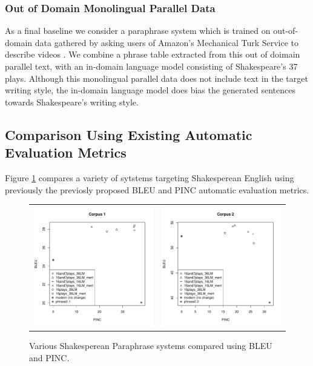 \documentclass[10pt,a5paper,twoside]{article}
\begin{document}
\subsubsection{Out of Domain Monolingual Parallel Data}
As a final baseline we consider a paraphrase system which is trained on out-of-domain data gathered by asking users of Amazon's Mechanical Turk Service 
\cite{Snow08} to describe videos \cite{chen11}.  We combine a phrase table extracted from this out of doimain parallel text, with an in-domain
language model consisting of Shakespeare's 37 plays.  Although this monolingual parallel data does not include text in the target writing style,
the in-domain language model does bias the generated sentences towards Shakespeare's writing style.

\subsection{Comparison Using Existing Automatic Evaluation Metrics}
Figure \ref{bleupinc} compares a variety of sytstems targeting Shakesperean English using previously the previosly proposed BLEU \cite{Papineni02} and PINC \cite{chen11} automatic evaluation metrics.

\begin{figure}
  \begin{center}
    \begin{tabular}{cc}
      \includegraphics[width=2.1in]{figures/bleupinc1.pdf} & \includegraphics[width=2.1in]{figures/bleupinc2.pdf} \\
    \end{tabular}
  \end{center}
  \caption{Various Shakesperean Paraphrase systems compared using BLEU and PINC.}
  \label{bleupinc}
\end{figure}
\end{document}
